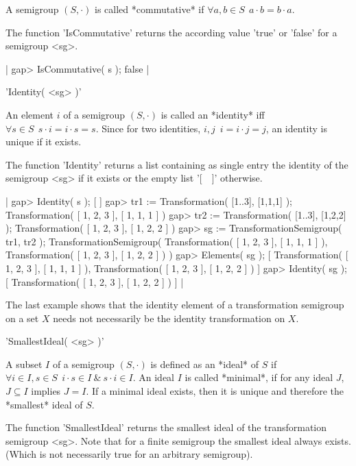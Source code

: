 A semigroup $(S,\cdot)$ is called *commutative* if 
$\forall a, b \in S\:\ a \cdot b = b \cdot a$.  

The function 'IsCommutative' returns 
the according value 'true' or 'false' for a semigroup <sg>.

|  gap> IsCommutative( s );
  false
|



'Identity( <sg> )'  

An element $i$ of a semigroup $(S,\cdot)$ is called an *identity* if\/f
$\forall s \in S\:\ s \cdot i = i \cdot s = s$. Since for two identities, 
$i,j$\:\ $i = i \cdot j = j$, an identity is unique if it exists.  

The function 'Identity' returns a list containing as single entry the 
identity of the semigroup <sg> 
if it exists or the empty list '[\ \ ]' otherwise.

|  gap> Identity( s );
  [  ]
  gap> tr1 := Transformation( [1..3], [1,1,1] );
  Transformation( [ 1, 2, 3 ], [ 1, 1, 1 ] )
  gap> tr2 := Transformation( [1..3], [1,2,2] );
  Transformation( [ 1, 2, 3 ], [ 1, 2, 2 ] )
  gap> sg := TransformationSemigroup( tr1, tr2 );
  TransformationSemigroup( Transformation( [ 1, 2, 3 ], 
  [ 1, 1, 1 ] ), Transformation( [ 1, 2, 3 ], [ 1, 2, 2 ] ) ) 
  gap> Elements( sg );
  [ Transformation( [ 1, 2, 3 ], [ 1, 1, 1 ] ), 
    Transformation( [ 1, 2, 3 ], [ 1, 2, 2 ] ) ]
  gap> Identity( sg );
  [ Transformation( [ 1, 2, 3 ], [ 1, 2, 2 ] ) ]
|

The last example shows that the identity element of a transformation 
semigroup on a set $X$ needs not necessarily be the identity transformation
on $X$.



'SmallestIdeal( <sg> )'  

A subset $I$ of a semigroup $(S,\cdot)$ is defined as an *ideal* of $S$ 
if $\forall i \in I, s \in S\:\ i \cdot s \in I\ \&\ s \cdot i \in I$. An  
ideal $I$ is called *minimal*, if for any ideal $J$, $J \subseteq I$
implies $J = I$. If a minimal ideal exists, then it is unique and therefore
the *smallest* ideal of $S$.

The function 'SmallestIdeal' returns the smallest ideal of the 
transformation semigroup <sg>. Note that for a finite semigroup the 
smallest ideal always exists. (Which is not necessarily true for an 
arbitrary semigroup).

